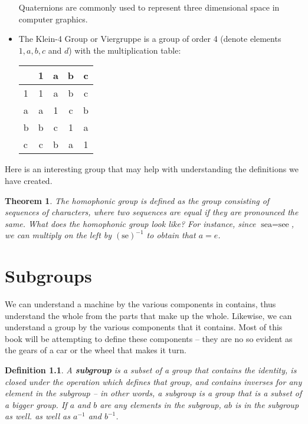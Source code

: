 \documentclass[12pt]{report}
\newtheorem{theorem}{Theorem}[section]
\newtheorem{definition}{Definition}
\begin{document}
\begin{itemize}
    Quaternions are commonly used to represent three dimensional space in computer graphics.
    \item The Klein-4 Group or Viergruppe is a group of order 4 (denote elements $1,a,b,c$ and $d$) with the multiplication table:

    \begin{tabular}{l|c c c c}
      & 1 & a & b & c\\
      \hline
    1 & 1 & a & b & c\\
    a & a & 1 & c & b\\
    b & b & c & 1 & a\\
    c & c & b & a & 1
    \end{tabular}
\end{itemize}

Here is an interesting group that may help with understanding the definitions we have created.

\begin{theorem}
    The homophonic group is defined as the group consisting of sequences of characters, where two sequences are equal if they are pronounced the same. What does the homophonic group look like? For instance, since $\text{sea} = \text{see}$, we can multiply on the left by $(\text{se})^{-1}$ to obtain that $a = e$.
\end{theorem}

\chapter{Subgroups}

We can understand a machine by the various components in contains, thus understand the whole from the parts that make up the whole. Likewise, we can understand a group by the various components that it contains. Most of this book will be attempting to define these components -- they are no so evident as the gears of a car or the wheel that makes it turn.

\begin{definition}
A {\bf subgroup} is a subset of a group that contains the identity, is closed under the operation which defines that group, and contains inverses for any element in the subgroup -- in other words, a subgroup is a group that is a subset of a bigger group. If $a$ and $b$ are any elements in the subgroup, $ab$ is in the subgroup as well. as well as $a^{-1}$ and $b^{-1}$.
\end{definition}
\end{document}
